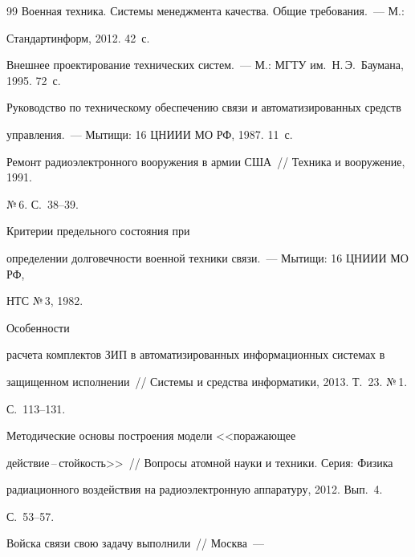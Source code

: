 {{\begin{thebibliography}{99}
Военная техника. Системы менеджмента качества. Общие требования.~--- М.: 


Стандартинформ, 2012. 42~с.









Внешнее проектирование технических систем.~--- М.: МГТУ им.\ Н.\,Э.~Баумана, 1995. 72~с.




Руководство по техническому обеспечению связи и автоматизированных средств 


управления.~--- Мытищи: 16 ЦНИИИ МО РФ, 1987. 11~с.






Ремонт радиоэлектронного вооружения в армии США~/\!\!/ Техника и вооружение, 1991. 


№\,6. С.~38--39.




 Критерии предельного состояния при 


определении долговечности военной техники связи.~--- Мытищи: 16 ЦНИИИ МО РФ, 


НТС №\,3, 1982.




 Особенности 


расчета комплектов ЗИП в автоматизированных информационных системах в 


защищенном исполнении~/\!\!/ Системы и средства информатики, 2013. Т.~23. №\,1. 


С.~113--131.




 Методические основы построения модели <<поражающее 


действие\,--\,стойкость>>~/\!\!/ Вопросы атомной науки и техники. Серия: Физика 


радиационного воздействия на радиоэлектронную аппаратуру, 2012. Вып.~4. 


С.~53--57.




 Войска связи свою задачу выполнили~/\!\!/ Москва~--- 



\end{thebibliography}}}
